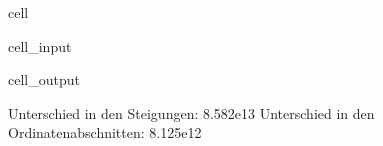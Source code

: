 \documentclass[letterpaper,10pt,english]{jupyterBook}
\begin{document}
\begin{sphinxuseclass}{cell}\begin{sphinxVerbatimInput}

\begin{sphinxuseclass}{cell_input}
\begin{sphinxVerbatim}[commandchars=\\\{\}]
 \PYG{p}{[}\PYG{p}{]}\PYG{p}{[}\PYG{p}{]}
 \PYG{p}{[}\PYG{p}{]}\PYG{p}{[}\PYG{p}{]}
\end{sphinxVerbatim}

\end{sphinxuseclass}\end{sphinxVerbatimInput}
\begin{sphinxVerbatimOutput}

\begin{sphinxuseclass}{cell_output}
\begin{sphinxVerbatim}[commandchars=\\\{\}]
Unterschied in den Steigungen: 		  8.582e\PYGZhy{}13
Unterschied in den Ordinatenabschnitten: \PYGZhy{}8.125e\PYGZhy{}12
\end{sphinxVerbatim}

\end{sphinxuseclass}\end{sphinxVerbatimOutput}

\end{sphinxuseclass}
\end{document}

